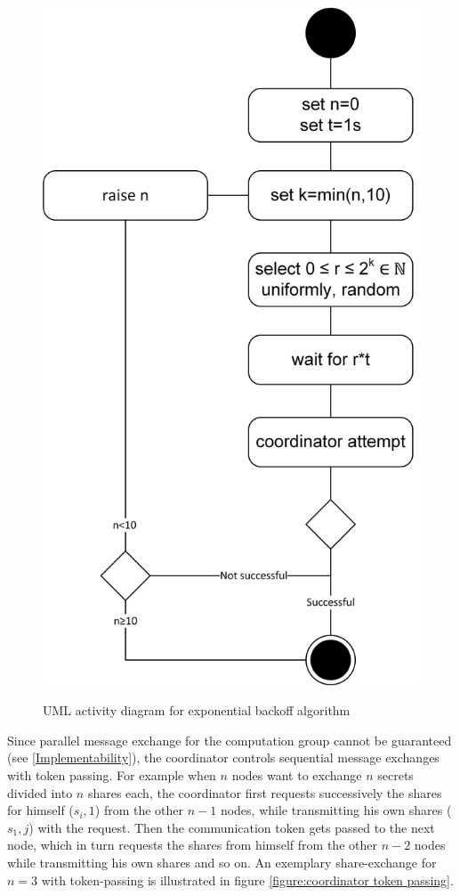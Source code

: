 		\begin{figure}[htbp] %
		\caption{\gls{UML} activity diagram for exponential backoff algorithm}
		\includegraphics[scale=0.8]{figures/exponential-backoff.png}
		\label{figure:coordinator exponential backoff}
		\end{figure}
		
		Since parallel message exchange for the computation group cannot be guaranteed (see \ref{Implementability}), the coordinator controls sequential message exchanges with token passing. For example when $n$ nodes want to exchange $n$ secrets divided into $n$ shares each, the coordinator first requests successively the shares for himself ($s_i,1$) from the other $n-1$ nodes, while transmitting his own shares ($s_1,j$) with the request. Then the communication token gets passed to the next node, which in turn requests the shares from himself from the other $n-2$ nodes while transmitting his own shares and so on. An exemplary share-exchange for $n=3$ with token-passing is illustrated in figure \ref{figure:coordinator token passing}.
		
